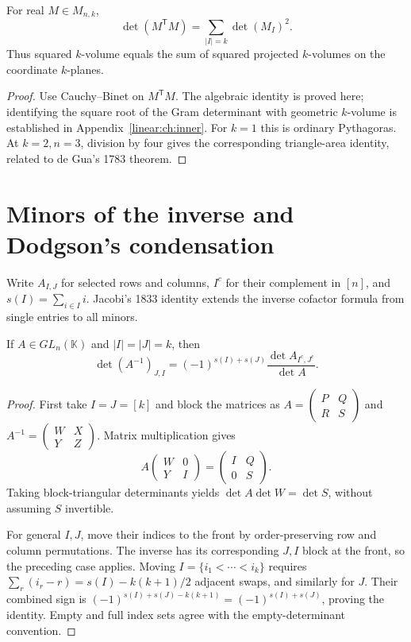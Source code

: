 \begin{corollary}[Pythagoras]\label{linear:cor:pythagoras}
For real $M\in M_{n,k}$,
\[\det(M^{\mathsf T}M)=\sum_{|I|=k}\det(M_I)^2.
\]
Thus squared $k$-volume equals the sum of squared projected $k$-volumes on the coordinate $k$-planes.
\end{corollary}
\begin{proof}
Use Cauchy--Binet on $M^{\mathsf T}M$. The algebraic identity is proved here; identifying the square root of the Gram determinant with geometric $k$-volume is established in Appendix~\ref{linear:ch:inner}. For $k=1$ this is ordinary Pythagoras. At $k=2,n=3$, division by four gives the corresponding triangle-area identity, related to de Gua's 1783 theorem.
\end{proof}

\section{Minors of the inverse and Dodgson's condensation}\label{linear:sec:condensation}

Write $A_{I,J}$ for selected rows and columns, $I^c$ for their complement in $[n]$, and $s(I)=\sum_{i\in I}i$. Jacobi's 1833 identity extends the inverse cofactor formula from single entries to all minors.

\begin{theorem}\label{linear:thm:jacobi}
If $A\in GL_n(\mathbb K)$ and $|I|=|J|=k$, then
\[\det(A^{-1})_{J,I}=(-1)^{s(I)+s(J)}\frac{\det A_{I^c,J^c}}{\det A}.\]
\end{theorem}
\begin{proof}
First take $I=J=[k]$ and block the matrices as $A=\begin{pmatrix}P&Q\\R&S\end{pmatrix}$ and $A^{-1}=\begin{pmatrix}W&X\\Y&Z\end{pmatrix}$. Matrix multiplication gives
\[A\begin{pmatrix}W&0\\Y&I\end{pmatrix}=\begin{pmatrix}I&Q\\0&S\end{pmatrix}.
\]
Taking block-triangular determinants yields $\det A\det W=\det S$, without assuming $S$ invertible.

For general $I,J$, move their indices to the front by order-preserving row and column permutations. The inverse has its corresponding $J,I$ block at the front, so the preceding case applies. Moving $I=\{i_1<\cdots<i_k\}$ requires $\sum_r(i_r-r)=s(I)-k(k+1)/2$ adjacent swaps, and similarly for $J$. Their combined sign is $(-1)^{s(I)+s(J)-k(k+1)}=(-1)^{s(I)+s(J)}$, proving the identity. Empty and full index sets agree with the empty-determinant convention.
\end{proof}

